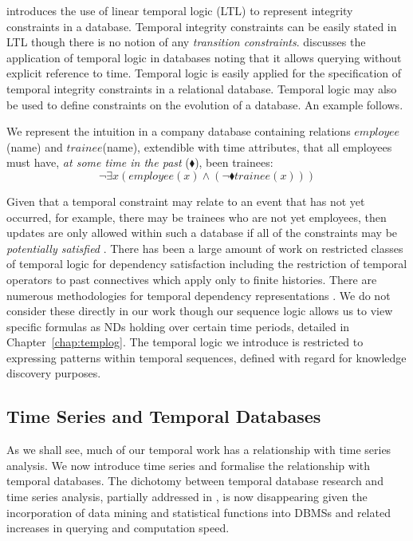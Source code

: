 \cite{cho94} introduces the use of linear temporal logic (LTL)
\cite{eme90} to represent 
integrity constraints in a database. Temporal 
integrity constraints can be easily stated in LTL though there is no notion of
any {\em transition constraints}. \cite{ct98} discusses the
application of temporal logic in databases noting that it allows
querying without explicit reference to time. Temporal logic is easily
applied for the specification of temporal integrity constraints in a
relational database.  Temporal logic may also be used to define
constraints on the evolution of a database. An example
follows.
\begin{example}
\begin{rm} 
We represent the intuition in a company database containing relations
\linebreak[4] $employee$(name) and $trainee$(name), extendible with
time attributes, that all employees must have, {\em at some time in the
past} ($\blacklozenge$), been trainees:
\[\neg \exists x ( employee(x) \wedge (\neg \blacklozenge trainee(x)))
\]
\end{rm}
\end{example}

Given that a temporal constraint may relate to an event that has not
yet occurred, for example, there may be trainees who are not yet
employees, then updates are only allowed within such a database if all
of the constraints may be {\em potentially satisfied}
\cite{ct98}. There has been a large amount of work on restricted
classes of temporal logic for dependency satisfaction including the
restriction of temporal operators to past connectives which apply only
to finite histories.
There are numerous methodologies for
temporal dependency representations \cite{jss96}. We do not consider these
directly in our work though our sequence logic allows us to view
specific formulas as NDs holding over certain time periods, detailed
in Chapter~\ref{chap:templog}. The temporal logic we introduce is
restricted to expressing patterns within temporal sequences, defined
with regard for knowledge discovery purposes. 


\subsection{Time Series and Temporal Databases}
As we shall see, much of our temporal work has a relationship with
time series analysis. We now introduce time series and formalise the
relationship with temporal databases. The dichotomy between temporal
database research and time series analysis, partially addressed in
\cite{smd95}, is now disappearing given the incorporation of data
mining and statistical functions into DBMSs and related increases in
querying and computation speed.

